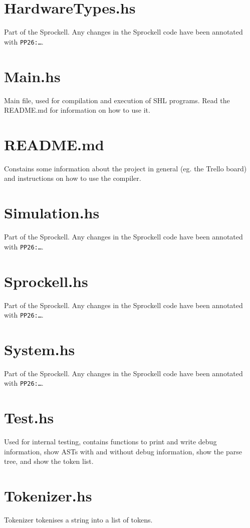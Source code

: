 \documentclass[twoside]{report}
\begin{document}
\section{HardwareTypes.hs}
Part of the Sprockell. Any changes in the Sprockell code have been annotated with \texttt{PP26:\ldots}.

\section{Main.hs}
Main file, used for compilation and execution of SHL programs. Read the README.md for information on how to use it.

\section{README.md}
Constains some information about the project in general (eg. the Trello board) and instructions on how to use the compiler.

\section{Simulation.hs}
Part of the Sprockell. Any changes in the Sprockell code have been annotated with \texttt{PP26:\ldots}.

\section{Sprockell.hs}
Part of the Sprockell. Any changes in the Sprockell code have been annotated with \texttt{PP26:\ldots}.

\section{System.hs}
Part of the Sprockell. Any changes in the Sprockell code have been annotated with \texttt{PP26:\ldots}.

\section{Test.hs}
Used for internal testing, contains functions to print and write debug information, show ASTs with and without debug information, show the parse tree, and show the token list.

\section{Tokenizer.hs}
Tokenizer tokenises a string into a list of tokens.
\end{document}
